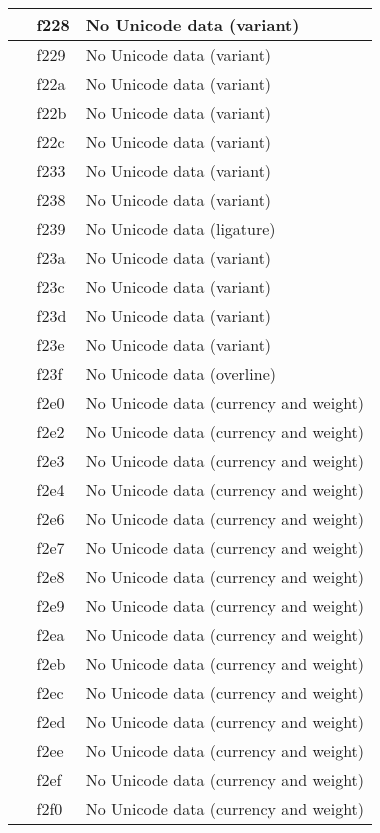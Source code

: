 \documentclass[12pt,letterpaper,openany]{book}
\begin{document}
\begin{center}
\begin{supertabular}{|m{0.25in}|m{0.5in}|m{4in}|}
			 & f228 & No Unicode data (variant)\\\hline
			 & f229 & No Unicode data (variant)\\\hline
			 & f22a & No Unicode data (variant)\\\hline
			 & f22b & No Unicode data (variant)\\\hline
			 & f22c & No Unicode data (variant)\\\hline
			 & f233 & No Unicode data (variant)\\\hline
			 & f238 & No Unicode data (variant)\\\hline
			 & f239 & No Unicode data (ligature)\\\hline
			 & f23a & No Unicode data (variant)\\\hline
			 & f23c & No Unicode data (variant)\\\hline
			 & f23d & No Unicode data (variant)\\\hline
			 & f23e & No Unicode data (variant)\\\hline
			 & f23f & No Unicode data (overline)\\\hline
			 & f2e0 & No Unicode data (currency and weight)\\\hline
			 & f2e2 & No Unicode data (currency and weight)\\\hline
			 & f2e3 & No Unicode data (currency and weight)\\\hline
			 & f2e4 & No Unicode data (currency and weight)\\\hline
			 & f2e6 & No Unicode data (currency and weight)\\\hline
			 & f2e7 & No Unicode data (currency and weight)\\\hline
			 & f2e8 & No Unicode data (currency and weight)\\\hline
			 & f2e9 & No Unicode data (currency and weight)\\\hline
			 & f2ea & No Unicode data (currency and weight)\\\hline
			 & f2eb & No Unicode data (currency and weight)\\\hline
			 & f2ec & No Unicode data (currency and weight)\\\hline
			 & f2ed & No Unicode data (currency and weight)\\\hline
			 & f2ee & No Unicode data (currency and weight)\\\hline
			 & f2ef & No Unicode data (currency and weight)\\\hline
			 & f2f0 & No Unicode data (currency and weight)\\\hline

\end{supertabular}
\end{center}
\end{document}
